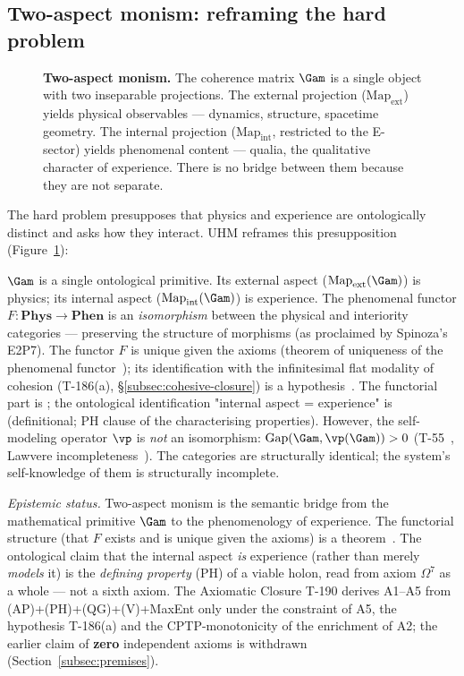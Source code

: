 \subsection{Two-aspect monism: reframing the hard problem}
\label{subsec:two-aspect}

\begin{figure}[H]
\centering

\caption{\textbf{Two-aspect monism.} The coherence matrix $\Gam$ is a single object with
two inseparable projections. The external projection ($\mathrm{Map}_{\mathrm{ext}}$) yields
physical observables --- dynamics, structure, spacetime geometry. The internal projection
($\mathrm{Map}_{\mathrm{int}}$, restricted to the E-sector) yields phenomenal content ---
qualia, the qualitative character of experience. There is no bridge between them because
they are not separate.}
\label{fig:two-aspect}
\end{figure}

The hard problem presupposes that physics and experience are ontologically
distinct and asks how they interact. UHM reframes this presupposition
(Figure~\ref{fig:two-aspect}):

\begin{definition}
\label{def:two-aspect}
$\Gam$ is a single ontological primitive. Its external aspect
($\mathrm{Map}_{\mathrm{ext}}(\Gam)$) is physics; its internal aspect
($\mathrm{Map}_{\mathrm{int}}(\Gam)$) is experience. The phenomenal functor
$F: \mathbf{Phys} \to \mathbf{Phen}$ is an \emph{isomorphism} between the physical
and interiority categories --- preserving the structure of morphisms (as proclaimed by
Spinoza's E2P7). The functor $F$ is unique given the axioms (theorem of uniqueness of
the phenomenal functor~); its identification with the infinitesimal flat
modality of cohesion (T-186(a), \S\ref{subsec:cohesive-closure}) is a
hypothesis~. The functorial part is ; the
ontological identification "internal aspect = experience" is 
(definitional; PH clause of the characterising properties). However, the self-modeling operator $\vp$ is
\emph{not} an isomorphism: $\mathrm{Gap}(\Gam, \vp(\Gam)) > 0$ (T-55~, Lawvere
incompleteness~\cite{lawvere1969}). The categories are structurally identical; the
system's self-knowledge of them is structurally incomplete.

\medskip\noindent\textit{Epistemic status.} Two-aspect monism is the semantic bridge
from the mathematical primitive $\Gam$ to the phenomenology of experience. The functorial
structure (that $F$ exists and is unique given the axioms) is a theorem~. The
ontological claim that the internal aspect \emph{is} experience (rather than merely
\emph{models} it) is the \emph{defining property} (PH) of a viable holon, read from
axiom $\Omega^7$ as a whole --- not a sixth axiom. The Axiomatic Closure T-190 derives
A1--A5 from (AP)+(PH)+(QG)+(V)+MaxEnt only  under the constraint of A5, the
hypothesis T-186(a) and the CPTP-monotonicity of the enrichment of A2; the earlier claim of \textbf{zero} independent axioms is withdrawn
(Section~\ref{subsec:premises}).
\end{definition}

